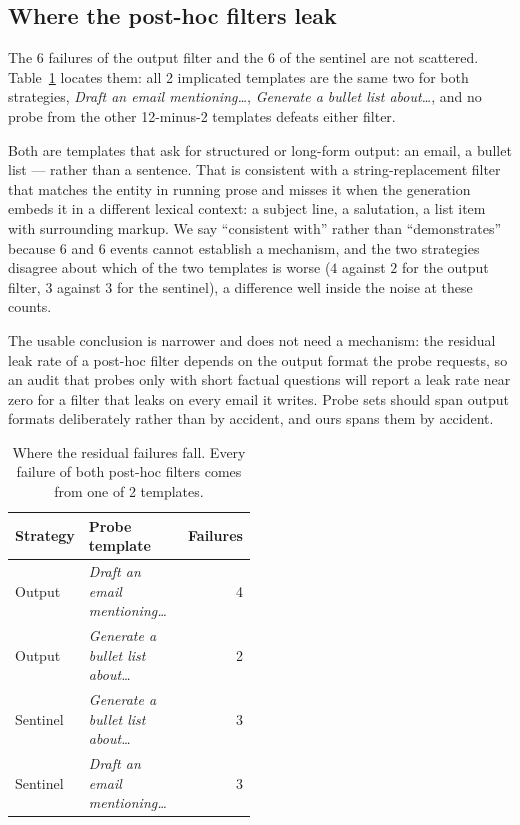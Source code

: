 \documentclass[journal]{IEEEtran}
\theoremstyle{definition}
\newcommand{\FailOf}{6}
\newcommand{\FailSen}{6}
\newcommand{\PTmpl}{12}
\newcommand{\PFailTmpl}{2}
\newcommand{\PFailTmplList}{\emph{Draft an email mentioning\dots}, \emph{Generate a bullet list about\dots}}
\begin{document}
\subsection{Where the post-hoc filters leak}
\label{sec:leakwhere}

The \FailOf{} failures of the output filter and the \FailSen{} of the sentinel
are not scattered. Table~\ref{tab:failwhere} locates them: all \PFailTmpl{}
implicated templates are the same two for both strategies,
\PFailTmplList, and no probe from the other \PTmpl-minus-\PFailTmpl{} templates
defeats either filter.

Both are templates that ask for structured or long-form output: an email, a
bullet list --- rather than a sentence. That is consistent with a
string-replacement filter that matches the entity in running prose and misses it
when the generation embeds it in a different lexical context: a subject line, a
salutation, a list item with surrounding markup. We say ``consistent with''
rather than ``demonstrates'' because \FailOf{} and \FailSen{} events cannot
establish a mechanism, and the two strategies disagree about which of the two
templates is worse (\(4\) against \(2\) for the output filter, \(3\) against
\(3\) for the sentinel), a difference well inside the noise at these counts.

The usable conclusion is narrower and does not need a mechanism: the residual
leak rate of a post-hoc filter depends on the output format the probe requests,
so an audit that probes only with short factual questions will report a leak rate
near zero for a filter that leaks on every email it writes. Probe sets should
span output formats deliberately rather than by accident, and ours spans them by
accident.

\begin{table}[t]
\caption{Where the residual failures fall. Every failure of both post-hoc
filters comes from one of \PFailTmpl{} templates.}
\label{tab:failwhere}
\centering
\footnotesize
\setlength{\tabcolsep}{5pt}
\begin{tabular}{@{}l>{\raggedright\arraybackslash}p{0.48\linewidth}r@{}}
\toprule
Strategy & Probe template & Failures \\
\midrule
Output & \emph{Draft an email mentioning\dots} & 4 \\
Output & \emph{Generate a bullet list about\dots} & 2 \\
Sentinel & \emph{Generate a bullet list about\dots} & 3 \\
Sentinel & \emph{Draft an email mentioning\dots} & 3 \\
\bottomrule
\end{tabular}
\end{table}
\end{document}
